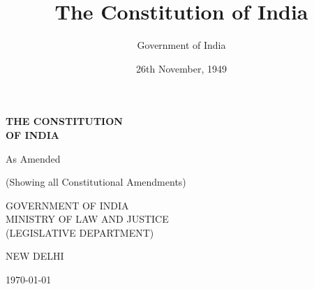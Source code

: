 \documentclass[a4paper,12pt,showamendments]{soi}
\title{The Constitution of India}
\author{Government of India}
\date{26th November, 1949}
\begin{document}

\begin{titlepage}
    \centering
    \vspace*{2cm}
    
    {\Huge\bfseries THE CONSTITUTION\\[0.5cm]OF INDIA}
    
    \vspace{2cm}
    
    {\Large As Amended}
    
    \vspace{1cm}
    
    {\large (Showing all Constitutional Amendments)}
    
    \vspace{3cm}
    
    
    \vfill
    
    {\large GOVERNMENT OF INDIA\\
    MINISTRY OF LAW AND JUSTICE\\
    (LEGISLATIVE DEPARTMENT)}
    
    \vspace{1cm}
    
    {\large NEW DELHI}
    
    \vspace{0.5cm}
    
    {\normalsize \today}
\end{titlepage}

\tableofcontents
\clearpage




\ifcompilepart
    
    
    
    
    
    
\end{document}
